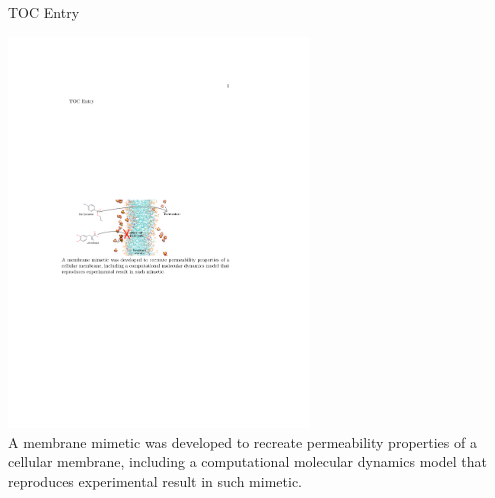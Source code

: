 \documentclass[letterpaper]{memoir}
\begin{document}
TOC Entry
\begin{vplace}
  \includegraphics[width=8cm]{tocEntry}\\
  A membrane mimetic was developed to recreate permeability properties of a
  cellular membrane, including a computational molecular dynamics model that
  reproduces experimental result in such mimetic.
\end{vplace}
\end{document}

